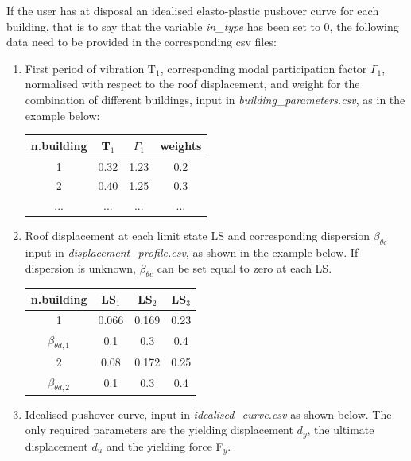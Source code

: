 If the user has at disposal an idealised elasto-plastic pushover curve for each building, that is to say that the variable \textit{in\_type} has been set to 0, the following data need to be provided in the corresponding csv files:

\begin{enumerate}
\item First period of vibration T$_1$, corresponding modal participation factor $\Gamma_1$, normalised with respect to the roof displacement, and weight for the combination of different buildings, input in \textit{building\_parameters.csv}, as in the example below:
	\begin{table}[!htbp]
	\centering
	\begin{tabular}{|c|c|c|c|} \hline
	\textbf{n.building} & \textbf{T$_1$} & \textbf{$\Gamma_1$} & \textbf{weights}\\ \hline
	1 & 0.32 & 1.23 & 0.2\\ \hline
	2 & 0.40 & 1.25 & 0.3\\ \hline
	... & ... & ... & ... \\ \hline
	\end{tabular}
	\end{table}
	
\item Roof displacement at each limit state LS and corresponding dispersion $\beta_{\theta c}$ input in \textit{displacement\_profile.csv}, as shown in the example below. If dispersion is unknown, $\beta_{\theta c}$ can be set equal to zero at each LS.
	\begin{table}[!htbp]
	\centering
	\begin{tabular}{|c|c|c|c|} \hline
	\textbf{n.building} & \textbf{LS$_1$} &	\textbf{LS$_2$} &	\textbf{LS$_3$} \\ \hline
	1 & 0.066 & 0.169 & 0.23\\ \hline
	$\beta_{\theta d, 1}$ & 0.1 & 0.3 & 0.4\\ \hline
	2 & 0.08 & 0.172 & 0.25\\ \hline
	$\beta_{\theta d, 2}$ & 0.1 & 0.3 & 0.4\\ \hline	
	\end{tabular}
	\end{table}
	
\item Idealised pushover curve, input in \textit{idealised\_curve.csv} as shown below. The only required parameters are the yielding displacement $d_y$, the ultimate displacement $d_u$ and the yielding force F$_y$.


\end{enumerate}
